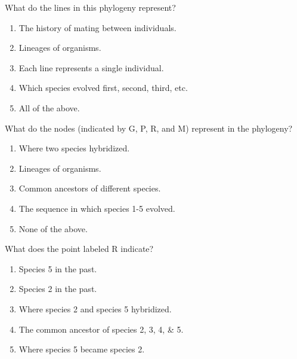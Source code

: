 \documentclass[t]{beamer}
\newcommand{\ques}[1]{\highlight{\textsc{q#1:}}}
\begin{document}
%
{
\begin{frame}[t]{\ques2 What do the lines in this phylogeny represent?}

	\begin{enumerate}
		\item The history of mating between individuals.

		\item Lineages of organisms.

		\item Each line represents a single individual.

		\item Which species evolved first, second, third, etc.

		\item All of the above. 

	\end{enumerate}

\end{frame}
}
%
{
\begin{frame}[t]{\ques3 What do the nodes (indicated by G, P, R, and M) represent in the phylogeny?}


	\begin{enumerate}
		\item Where two species hybridized.
		
		\item Lineages of organisms.
		
		\item Common ancestors of different species.
		
		\item The sequence in which species 1-5 evolved.
		
		\item None of the above.

	\end{enumerate}

\end{frame}
}
%
{
\begin{frame}[t]{\ques4  What does the point labeled R indicate?}
	
	\begin{enumerate}
		\item Species 5 in the past.
		
		\item Species 2 in the past.

		\item Where species 2 and species 5 hybridized.

		\item The common ancestor of species 2, 3, 4, \& 5.

		\item Where species 5 became species 2.

	\end{enumerate}
\end{frame}
}
\end{document}
